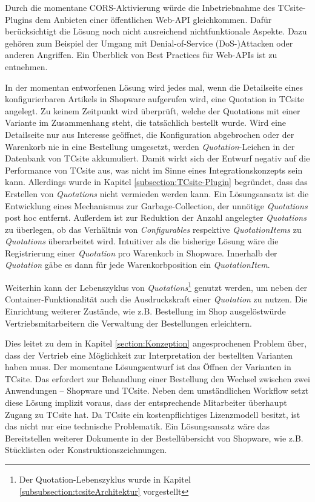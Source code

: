 \documentclass[11pt, a4paper, titlepage, listof=totoc, bibliography=totoc, index=totoc, twoside, openright, headings=normal]{scrreprt}
\begin{document}
Durch die momentane CORS-Aktivierung würde die Inbetriebnahme des TCsite-Plugins dem Anbieten einer öffentlichen Web-API gleichkommen. Dafür berücksichtigt die Lösung noch nicht ausreichend nichtfunktionale Aspekte. Dazu gehören zum Beispiel der Umgang mit Denial-of-Service (DoS-)Attacken oder anderen Angriffen. Ein Überblick von Best Practices für Web-APIs ist \citet{tilkov11} zu entnehmen.

In der momentan entworfenen Lösung wird jedes mal, wenn die Detailseite eines konfigurierbaren Artikels in Shopware aufgerufen wird, eine Quotation in TCsite angelegt. Zu keinem Zeitpunkt wird überprüft, welche der Quotations mit einer Variante im Zusammenhang steht, die tatsächlich bestellt wurde. Wird eine Detailseite nur aus Interesse geöffnet, die Konfiguration abgebrochen oder der Warenkorb nie in eine Bestellung umgesetzt, werden \glqq \emph{Quotation}-Leichen\grqq{} in der Datenbank von TCsite akkumuliert. Damit wirkt sich der Entwurf negativ auf die Performance von TCsite aus, was nicht im Sinne eines Integrationskonzepts sein kann. Allerdings wurde in Kapitel \ref{subsection:TCsite-Plugin} begründet, dass das Erstellen von \emph{Quotations} nicht vermieden werden kann. Ein Lösungsansatz ist die Entwicklung eines Mechanismus zur Garbage-Collection, der unnötige \emph{Quotations} post hoc entfernt. Außerdem ist zur Reduktion der Anzahl angelegter \emph{Quotations} zu überlegen, ob das Verhältnis von \emph{Configurables} respektive \emph{QuotationItems} zu \emph{Quotations} überarbeitet wird. Intuitiver als die bisherige Lösung wäre die Registrierung einer \emph{Quotation} pro Warenkorb in Shopware. Innerhalb der \emph{Quotation} gäbe es dann für jede Warenkorbposition ein \emph{QuotationItem}.

Weiterhin kann der Lebenszyklus von \emph{Quotations}\footnote{Der Quotation-Lebenszyklus wurde in Kapitel \ref{subsubsection:tcsiteArchitektur} vorgestellt} genutzt werden, um neben der Container-Funktionalität auch die Ausdruckskraft einer \emph{Quotation} zu nutzen. Die Einrichtung weiterer Zustände, wie z.B. \glqq Bestellung im Shop ausgelöst\grqq würde Vertriebsmitarbeitern die Verwaltung der Bestellungen erleichtern.

Dies leitet zu dem in Kapitel \ref{section:Konzeption} angesprochenen Problem über, dass der Vertrieb eine Möglichkeit zur Interpretation der bestellten Varianten haben muss. Der momentane Lösungsentwurf ist das Öffnen der Varianten in TCsite. Das erfordert zur Behandlung einer Bestellung den Wechsel zwischen zwei Anwendungen -- Shopware und TCsite. Neben dem umständlichen Workflow setzt diese Lösung implizit voraus, dass der entsprechende Mitarbeiter überhaupt Zugang zu TCsite hat. Da TCsite ein kostenpflichtiges Lizenzmodell besitzt, ist das nicht nur eine technische Problematik. Ein Lösungsansatz wäre das Bereitstellen weiterer Dokumente in der Bestellübersicht von Shopware, wie z.B. Stücklisten oder Konstruktionszeichnungen.
\end{document}
